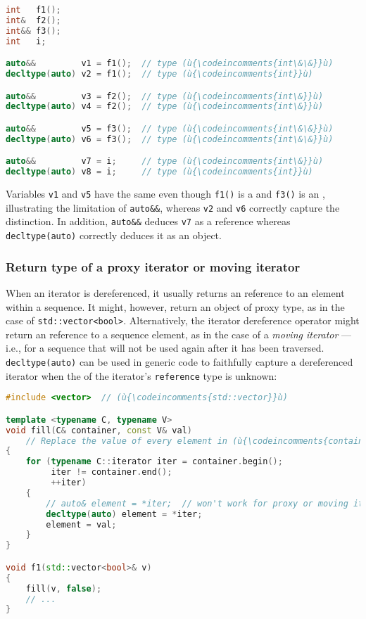\begin{lstlisting}[language=C++]
int   f1();
int&  f2();
int&& f3();
int   i;

auto&&         v1 = f1();  // type (ù{\codeincomments{int\&\&}}ù)
decltype(auto) v2 = f1();  // type (ù{\codeincomments{int}}ù)

auto&&         v3 = f2();  // type (ù{\codeincomments{int\&}}ù)
decltype(auto) v4 = f2();  // type (ù{\codeincomments{int\&}}ù)

auto&&         v5 = f3();  // type (ù{\codeincomments{int\&\&}}ù)
decltype(auto) v6 = f3();  // type (ù{\codeincomments{int\&\&}}ù)

auto&&         v7 = i;     // type (ù{\codeincomments{int\&}}ù)
decltype(auto) v8 = i;     // type (ù{\codeincomments{int}}ù)
\end{lstlisting}
    

Variables \lstinline!v1! and \lstinline!v5! have the same  even though \lstinline!f1()! is a  and
\lstinline!f3()! is an , illustrating the limitation of
\lstinline!auto&&!, whereas \lstinline!v2! and \lstinline!v6! correctly capture
the distinction. In addition, \lstinline!auto&&! deduces \lstinline!v7! as a
reference whereas \lstinline!decltype(auto)! correctly deduces it as an
object.

\subsubsection[Return type of a proxy iterator or moving iterator]{Return type of a proxy iterator or moving iterator}\label{return-type-of-a-proxy-iterator-or-moving-iterator}

When an iterator is dereferenced, it usually returns an 
reference to an element within a sequence. It might, however, return an
 object of proxy type, as in the case of
\lstinline!std::vector<bool>!. Alternatively, the iterator dereference
operator might return an  reference to a sequence element,
as in the case of a \emph{moving iterator} --- i.e., for a sequence that
will not be used again after it has been traversed.
\lstinline!decltype(auto)! can be used in generic code to faithfully
capture a dereferenced iterator when the  of the
iterator's \lstinline!reference! type is unknown:

\begin{lstlisting}[language=C++]
#include <vector>  // (ù{\codeincomments{std::vector}}ù)

template <typename C, typename V>
void fill(C& container, const V& val)
    // Replace the value of every element in (ù{\codeincomments{container}}ù) with a copy of (ù{\codeincomments{val}}ù).
{
    for (typename C::iterator iter = container.begin();
         iter != container.end();
         ++iter)
    {
        // auto& element = *iter;  // won't work for proxy or moving iterators
        decltype(auto) element = *iter;
        element = val;
    }
}

void f1(std::vector<bool>& v)
{
    fill(v, false);
    // ...
}
\end{lstlisting}
    

